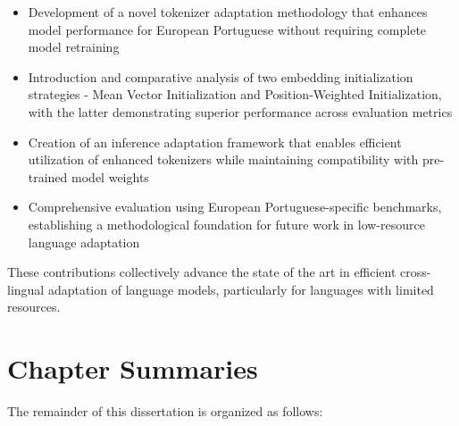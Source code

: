\begin{itemize}
    \item Development of a novel tokenizer adaptation methodology that enhances model performance for European Portuguese without requiring complete model retraining
    
    \item Introduction and comparative analysis of two embedding initialization strategies - Mean Vector Initialization and Position-Weighted Initialization, with the latter demonstrating superior performance across evaluation metrics
    
    \item Creation of an inference adaptation framework that enables efficient utilization of enhanced tokenizers while maintaining compatibility with pre-trained model weights
    
    \item Comprehensive evaluation using European Portuguese-specific benchmarks, establishing a methodological foundation for future work in low-resource language adaptation
\end{itemize}

These contributions collectively advance the state of the art in efficient cross-lingual adaptation of language models, particularly for languages with limited resources.

\section{Chapter Summaries}\label{Section1.5}
The remainder of this dissertation is organized as follows:


